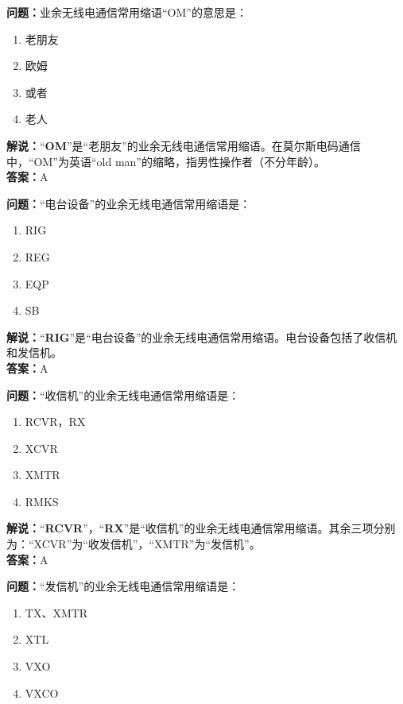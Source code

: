 \textbf{问题：}业余无线电通信常用缩语“OM”的意思是：

\begin{enumerate}[label=\Alph*), leftmargin=1cm]
	\item 老朋友
	\item 欧姆
	\item 或者
	\item 老人
\end{enumerate}

\textbf{解说：}“\textbf{OM}”是“老朋友”的业余无线电通信常用缩语。在莫尔斯电码通信中，“OM”为英语“old man”的缩略，指男性操作者（不分年龄）。\\\textbf{答案：}A



\textbf{问题：}“电台设备”的业余无线电通信常用缩语是：

\begin{enumerate}[label=\Alph*), leftmargin=1cm]
	\item RIG
	\item REG
	\item EQP
	\item SB
\end{enumerate}

\textbf{解说：}“\textbf{RIG}”是“电台设备”的业余无线电通信常用缩语。电台设备包括了收信机和发信机。\\\textbf{答案：}A



\textbf{问题：}“收信机”的业余无线电通信常用缩语是：

\begin{enumerate}[label=\Alph*), leftmargin=1cm]
	\item RCVR，RX
	\item XCVR
	\item XMTR
	\item RMKS
\end{enumerate}

\textbf{解说：}“\textbf{RCVR}”，“\textbf{RX}”是“收信机”的业余无线电通信常用缩语。其余三项分别为：“XCVR”为“收发信机”，“XMTR”为“发信机”。\\\textbf{答案：}A



\textbf{问题：}“发信机”的业余无线电通信常用缩语是：

\begin{enumerate}[label=\Alph*), leftmargin=1cm]
	\item TX、XMTR
	\item XTL
	\item VXO
	\item VXCO
\end{enumerate}

